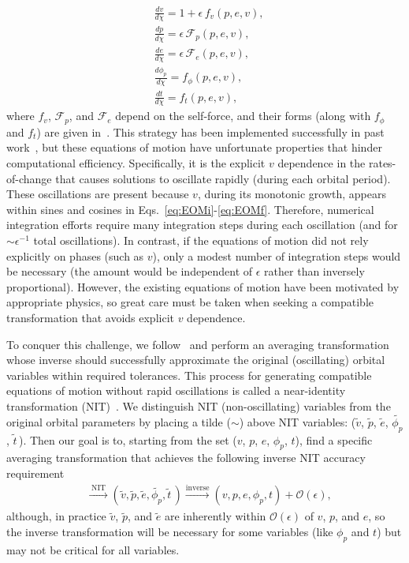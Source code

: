 \documentclass[aps,prd,twocolumn,showpacs,notitlepage,eqsecnum,
superscriptaddress,nofootinbib]{revtex4-1}
\begin{document}
\begin{align}
\label{eq:EOMi}
& \frac{dv}{d\chi} = 1 + \epsilon \, f_v(p,e,v) ,
\\
& \frac{dp}{d\chi} = \epsilon \, \mathcal{F}_p(p,e,v) ,
\\
& \frac{de}{d\chi} = \epsilon \, \mathcal{F}_e(p,e,v) ,
\\
&\frac{d\phi_p}{d\chi} = f_\phi(p,e,v) ,
\\
&\frac{dt}{d\chi} = f_t(p,e,v) ,
\label{eq:EOMf}
\end{align}
where $f_v$, $\mathcal{F}_p$, and $\mathcal{F}_e$ depend on the self-force, and their forms (along with $f_\phi$ and $f_t$) are given in~\cite{VandWarb18}. This strategy has been implemented successfully in past work~\cite{WarbAkca12,OsbuWarb16,WarbOsbu17}, but these equations of motion have unfortunate properties that hinder computational efficiency. Specifically, it is the explicit $v$ dependence in the rates-of-change that causes solutions to oscillate rapidly (during each orbital period). These oscillations are present because $v$, during its monotonic growth, appears within sines and cosines in Eqs.~\eqref{eq:EOMi}-\eqref{eq:EOMf}. Therefore, numerical integration efforts require many integration steps during each oscillation (and for $\sim \epsilon^{-1}$ total oscillations). In contrast, if the equations of motion did not rely explicitly on phases (such as $v$), only a modest number of integration steps would be necessary (the amount would be independent of $\epsilon$ rather than inversely proportional). However, the existing equations of motion have been motivated by appropriate physics, so great care must be taken when seeking a compatible transformation that avoids explicit $v$ dependence.

To conquer this challenge, we follow~\cite{VandWarb18} and perform an averaging transformation whose inverse should successfully approximate the original (oscillating) orbital variables within required tolerances. This process for generating compatible equations of motion without rapid oscillations is called a near-identity transformation (NIT)~\cite{KevoCole96}. We distinguish NIT (non-oscillating) variables from the original orbital parameters by placing a tilde ($\sim$) above NIT variables: ($\tilde{v}$, $\tilde{p}$, $\tilde{e}$, $\tilde{\phi_p}$, $\tilde{t}$\,). Then our goal is to, starting from the set ($v$, $p$, $e$, $\phi_p$, $t$), find a specific averaging transformation that achieves the following inverse NIT accuracy requirement
\begin{align}
\label{eq:NITaccuracy}
&\xrightarrow{\;\mathrm{NIT}\;} (\tilde{v}, \tilde{p}, \tilde{e}, \tilde{\phi_p}, \tilde{t}\,) \xrightarrow{\mathrm{inverse}} (v, p, e, \phi_p, t) + \mathcal{O}(\epsilon) ,
\end{align}
although, in practice $\tilde{v}$, $\tilde{p}$, and $\tilde{e}$ are inherently within $\mathcal{O}(\epsilon)$ of $v$, $p$, and $e$, so the inverse transformation will be necessary for some variables (like $\phi_p$ and $t$) but may not be critical for all variables. 
\end{document}
